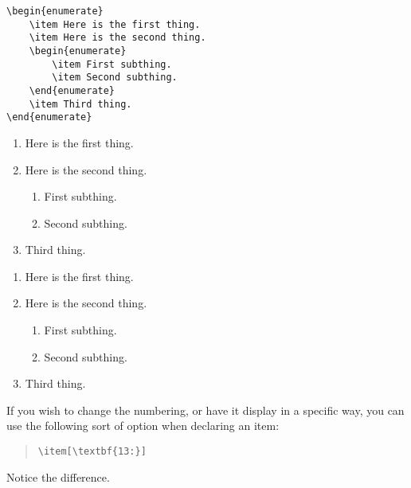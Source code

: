 \documentclass[letterpaper,twoside,10pt]{article}
\begin{document}
\begin{multicols}{2}
{\begin{verbatim}
\begin{enumerate}
    \item Here is the first thing.
    \item Here is the second thing.
    \begin{enumerate}
        \item First subthing.
        \item Second subthing.
    \end{enumerate}
    \item Third thing.
\end{enumerate}
\end{verbatim}}

\vspace{8pc}
\begin{enumerate}
    \item Here is the first thing.
    \item Here is the second thing.
    \begin{enumerate}
        \item First subthing.
        \item Second subthing.
    \end{enumerate}
    \item Third thing.
\end{enumerate}
\begin{enumerate}
    \item Here is the first thing.
    \item Here is the second thing.
    \begin{enumerate}
        \item First subthing.
        \item Second subthing.
    \end{enumerate}
    \item Third thing.
\end{enumerate}
\end{multicols}

If you wish to change the numbering, or have it display in a specific way, you can use the following
sort of option when declaring an item:

\begin{quote}
\verb!\item[\textbf{13:}]!
\end{quote}

Notice the difference.
\end{document}
